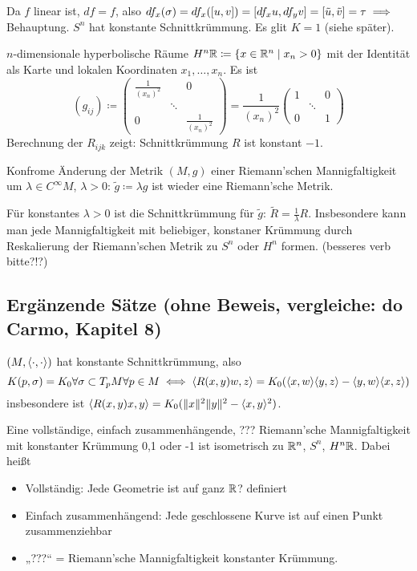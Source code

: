\documentclass[a4paper,twoside,DIV15,BCOR12mm]{scrbook}
\renewcommand{\da}{\coloneqq}
\begin{document}
\begin{bemerkungen}
\begin{beweis}
Da $f$ linear ist, $df=f$, also $df_x(\sigma) = df_x([u,v]) = [df_xu, df_yv] = [\tilde u, \tilde v] = \tau \implies$ Behauptung. $S^n$ hat konstante Schnittkrümmung. Es glit $K=1$ (siehe später).
\end{beweis}

\item $n$-dimensionale hyperbolische Räume $H^n\MdR \da \{ x\in\MdR^n \mid x_n > 0\}$ mit der Identität als Karte und lokalen Koordinaten $x_1,\ldots,x_n$. Es ist
\[
(g_{ij}) \da 
\begin{pmatrix}
\frac{1}{(x_n)^2} & & 0 \\
& \ddots & \\
0 & & \frac 1 {(x_n)^2}
\end{pmatrix} = \frac 1 {(x_n)^2} 
\begin{pmatrix}
1 & & 0 \\
& \ddots & \\
0 & & 1
\end{pmatrix}
\] Berechnung der $R_{ijk}$ zeigt: Schnittkrümmung $R$ ist konstant $-1$.

\item Konfrome Änderung der Metrik $(M,g)$ einer Riemann’schen Mannigfaltigkeit um $\lambda \in C^\infty M$, $\lambda >0$: $\tilde g \da \lambda g$ ist wieder eine Riemann’sche Metrik.

Für konstantes $\lambda>0$ ist die Schnittkrümmung für $\tilde g$: $\tilde R=\frac 1\lambda R$. Insbesondere kann man jede Mannigfaltigkeit mit beliebiger, konstaner Krümmung durch Reskalierung der Riemann’schen Metrik zu $S^n$ oder $H^n$ formen. (besseres verb bitte?!?)

\end{bemerkungen}

\subsection*{Ergänzende Sätze (ohne Beweis, vergleiche: do Carmo, Kapitel 8)}

\begin{satz*}
$(M, \langle\cdot,\cdot\rangle)$ hat konstante Schnittkrümmung, also
\[ K(p,\sigma) = K_0 \forall \sigma \subset T_pM
\forall p \in M \iff \langle R(x,y)w,z\rangle = K_0 (\langle x,w\rangle \langle y,z\rangle - \langle y,w\rangle \langle x,z\rangle)
\]
insbesondere ist $\langle R(x,y)x,y\rangle = K_0(\|x\|^2\|y\|^2 - \langle x,y\rangle ^2)$.
\end{satz*}

\begin{satz*}[Hopf]
Eine vollständige, einfach zusammenhängende, ??? Riemann’sche Mannigfaltigkeit mit konstanter Krümmung 0,1 oder -1 ist isometrisch zu $\mathbb{R}^n$, $S^n$, $H^n\mathbb{R}$. Dabei heißt
\begin{itemize}
\item Vollständig: Jede Geometrie ist auf ganz $\mathbb{R}$? definiert
\item Einfach zusammenhängend: Jede geschlossene Kurve ist auf einen Punkt zusammenziehbar
\item „???“ = Riemann’sche Mannigfaltigkeit konstanter Krümmung.
\end{itemize}

\end{satz*}
\end{document}
